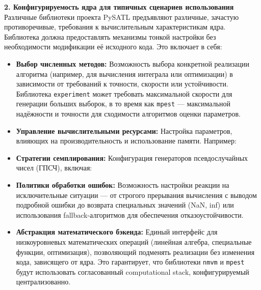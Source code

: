 \textbf{2.  Конфигурируемость ядра для типичных сценариев использования}\\
Различные библиотеки проекта PySATL предъявляют различные, зачастую противоречивые, требования к вычислительным характеристикам ядра. Библиотека должна предоставлять механизмы тонкой настройки без необходимости модификации её исходного кода. Это включает в себя:

\begin{itemize}[noitemsep, topsep=0pt, parsep=0pt]
    \item \textbf{Выбор численных методов:} Возможность выбора конкретной реализации алгоритма (например, для вычисления интеграла или оптимизации) в зависимости от требований к точности, скорости или устойчивости. Библиотека \texttt{experiment} может требовать максимальной скорости для генерации больших выборок, в то время как \texttt{mpest} — максимальной надёжности и точности для сходимости алгоритмов оценки параметров.
    \item \textbf{Управление вычислительными ресурсами:} Настройка параметров, влияющих на производительность и использование памяти. Например:
    \item \textbf{Стратегии семплирования:} Конфигурация генераторов псевдослучайных чисел (ГПСЧ), включая:
    \item \textbf{Политики обработки ошибок:} Возможность настройки реакции на исключительные ситуации --- от строгого прерывания вычисления с выводом подробной ошибки до возврата специальных значений (NaN, inf) или использования fallback-алгоритмов для обеспечения отказоустойчивости.
    \item \textbf{Абстракция математического бэкенда:} Единый интерфейс для низкоуровневых математических операций (линейная алгебра, специальные функции, оптимизация), позволяющий подменять реализации без изменения кода, зависящего от ядра. Это гарантирует, что библиотеки \texttt{nmvm} и \texttt{mpest} будут использовать согласованный computational stack, конфигурируемый централизованно.
\end{itemize}


